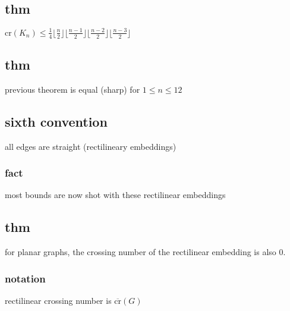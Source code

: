 \documentclass[letterpaper]{article}
\begin{document}
\subsection*{thm}
$\text{cr}(K_n)\le \frac{1}{4}\lfloor\frac{n}{2}\rfloor\lfloor\frac{n-1}{2}\rfloor\lfloor\frac{n-2}{2}\rfloor\lfloor\frac{n-3}{2}\rfloor$

\subsection*{thm}
previous theorem is equal (sharp) for $1\le n\le 12$

\subsection*{sixth convention}
all edges are straight (rectilineary embeddings)

\subsubsection*{fact}
most bounds are now shot with these rectilinear embeddings

\subsection*{thm}
for planar graphs, the crossing number of the rectilinear embedding is also $0$.

\subsubsection*{notation}
rectilinear crossing number is $\overline{\text{cr}}(G)$
\end{document}
